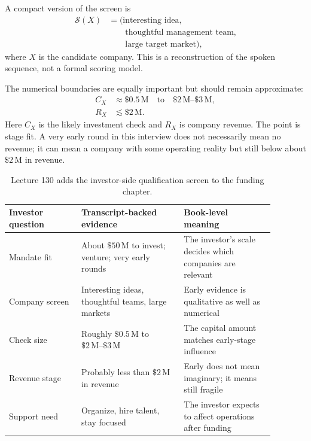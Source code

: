 \documentclass[11pt,oneside]{book}
\begin{document}
A compact version of the screen is
\begin{align}
\mathcal{S}(X)
&=
\bigl(
\text{interesting idea}, \nonumber\\
&\qquad
\text{thoughtful management team}, \nonumber\\
&\qquad
\text{large target market}
\bigr),
\end{align}
where \(X\) is the candidate company. This is a reconstruction of the spoken sequence, not a formal scoring model.

The numerical boundaries are equally important but should remain approximate:
\begin{align}
C_X &\approx \$0.5\,\mathrm{M}
\quad \text{to} \quad
\$2\,\mathrm{M}\text{--}\$3\,\mathrm{M},\\
R_X &\lesssim \$2\,\mathrm{M}.
\end{align}
Here \(C_X\) is the likely investment check and \(R_X\) is company revenue. The point is stage fit. A very early round in this interview does not necessarily mean no revenue; it can mean a company with some operating reality but still below about \( \$2\,\mathrm{M} \) in revenue.

\begin{table}
\centering
\small
\begin{tabular}{p{0.24\linewidth}p{0.34\linewidth}p{0.30\linewidth}}
\hline
Investor question & Transcript-backed evidence & Book-level meaning \\
\hline
Mandate fit & About \( \$50\,\mathrm{M} \) to invest; venture; very early rounds & The investor's scale decides which companies are relevant \\
Company screen & Interesting ideas, thoughtful teams, large markets & Early evidence is qualitative as well as numerical \\
Check size & Roughly \( \$0.5\,\mathrm{M} \) to \( \$2\,\mathrm{M}\text{--}\$3\,\mathrm{M} \) & The capital amount matches early-stage influence \\
Revenue stage & Probably less than \( \$2\,\mathrm{M} \) in revenue & Early does not mean imaginary; it means still fragile \\
Support need & Organize, hire talent, stay focused & The investor expects to affect operations after funding \\
\hline
\end{tabular}
\caption{Lecture 130 adds the investor-side qualification screen to the funding chapter.}
\end{table}
\end{document}
